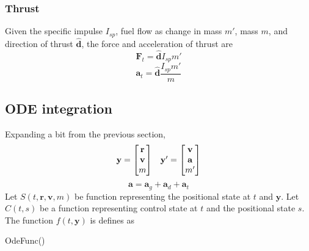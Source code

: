 \subsubsection{Thrust}
Given the specific impulse $I_{sp}$, fuel flow as change in mass $m'$, mass $m$, and direction of thrust $\hat{\mathbf{d}}$,
the force and acceleration of thrust are
\begin{equation}
    \label{force_thrust}
    \mathbf{F}_t=\hat{\mathbf{d}}I_{sp}m'
\end{equation}
\begin{equation}
    \label{accel_thrust}
    \mathbf{a}_t=\hat{\mathbf{d}}\frac{I_{sp}m'}{m}
\end{equation}

\subsection{ODE integration}
Expanding a bit from the previous section,
\begin{equation}
    \begin{array}{c c}
        \mathbf{y}=
        \begin{bmatrix}
            \mathbf{r} \\
            \mathbf{v} \\
            m
        \end{bmatrix} &
        \mathbf{y}'=
        \begin{bmatrix}
            \mathbf{v} \\
            \mathbf{a} \\
            m'
        \end{bmatrix}
    \end{array}
\end{equation}
\[
    \mathbf{a}=\mathbf{a}_g+\mathbf{a}_d+\mathbf{a}_t
\]
Let $S\left(t,\mathbf{r}, \mathbf{v}, m\right)$ be function representing the positional state at $t$ and $\mathbf{y}$.
Let $C\left(t,s\right)$ be a function representing control state at $t$ and the positional state $s$.
The function $f\left(t,\mathbf{y}\right)$ is defines as
\begin{function}
    \DontPrintSemicolon
    \caption{OdeFunc()}
\end{function}

